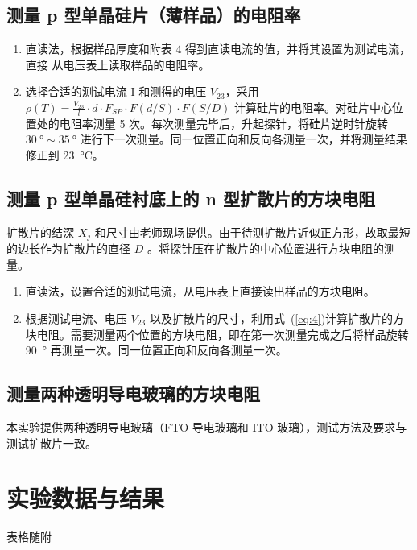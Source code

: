 \documentclass[a4paper,utf8]{article}
\newcommand{\seqref}[1]{式~(\ref{#1})}
\begin{document}
    \subsection{测量 p 型单晶硅片（薄样品）的电阻率}
        \begin{enumerate}
            \item 直读法，根据样品厚度和附表 4 得到直读电流的值，并将其设置为测试电流，直接
            从电压表上读取样品的电阻率。
            \item 选择合适的测试电流 I 和测得的电压 $V_{23}$，采用 $\rho(T)=\frac{V_{23}}l\cdot d\cdot F_{SP}\cdot F(d/S)\cdot F(S/D)$ 计算硅片的电阻率。对硅片中心位置处的电阻率测量 5 次。每次测量完毕后，升起探针，将硅片逆时针旋转 $\SI{30}{\degree} \sim  \SI{35}{\degree}$ 进行下一次测量。同一位置正向和反向各测量一次，并将测量结果修正到 \SI{23}{\degreeCelsius}。
        \end{enumerate}
    \subsection{测量 p 型单晶硅衬底上的 n 型扩散片的方块电阻 }
        扩散片的结深 $X_j$ 和尺寸由老师现场提供。由于待测扩散片近似正方形，故取最短的边长作为扩散片的直径 $D$ 。将探针压在扩散片的中心位置进行方块电阻的测量。
        \begin{enumerate}
            \item 直读法，设置合适的测试电流，从电压表上直接读出样品的方块电阻。
            \item 根据测试电流、电压 $V_{23}$ 以及扩散片的尺寸，利用\seqref{eq:4}计算扩散片的方块电阻。需要测量两个位置的方块电阻，即在第一次测量完成之后将样品旋转 \SI{90}{\degree} 再测量一次。同一位置正向和反向各测量一次。
        \end{enumerate}
    \subsection{测量两种透明导电玻璃的方块电阻}
        本实验提供两种透明导电玻璃（FTO 导电玻璃和 ITO 玻璃），测试方法及要求与测试扩散片一致。

\section{实验数据与结果}
    表格随附
\end{document}
